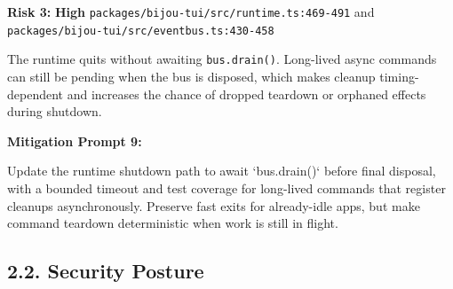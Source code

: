 \textbf{Risk 3:} \textbf{High} \textbar{} \texttt{p\allowbreak{}a\allowbreak{}c\allowbreak{}k\allowbreak{}a\allowbreak{}g\allowbreak{}e\allowbreak{}s\allowbreak{}/\allowbreak{}b\allowbreak{}i\allowbreak{}j\allowbreak{}o\allowbreak{}u\allowbreak{}-\allowbreak{}t\allowbreak{}u\allowbreak{}i\allowbreak{}/\allowbreak{}s\allowbreak{}r\allowbreak{}c\allowbreak{}/\allowbreak{}r\allowbreak{}u\allowbreak{}n\allowbreak{}t\allowbreak{}i\allowbreak{}m\allowbreak{}e\allowbreak{}.\allowbreak{}t\allowbreak{}s\allowbreak{}:\allowbreak{}4\allowbreak{}6\allowbreak{}9\allowbreak{}-\allowbreak{}4\allowbreak{}9\allowbreak{}1} and \texttt{p\allowbreak{}a\allowbreak{}c\allowbreak{}k\allowbreak{}a\allowbreak{}g\allowbreak{}e\allowbreak{}s\allowbreak{}/\allowbreak{}b\allowbreak{}i\allowbreak{}j\allowbreak{}o\allowbreak{}u\allowbreak{}-\allowbreak{}t\allowbreak{}u\allowbreak{}i\allowbreak{}/\allowbreak{}s\allowbreak{}r\allowbreak{}c\allowbreak{}/\allowbreak{}e\allowbreak{}v\allowbreak{}e\allowbreak{}n\allowbreak{}t\allowbreak{}b\allowbreak{}u\allowbreak{}s\allowbreak{}.\allowbreak{}t\allowbreak{}s\allowbreak{}:\allowbreak{}4\allowbreak{}3\allowbreak{}0\allowbreak{}-\allowbreak{}4\allowbreak{}5\allowbreak{}8}

The runtime quits without awaiting \texttt{b\allowbreak{}u\allowbreak{}s\allowbreak{}.\allowbreak{}d\allowbreak{}r\allowbreak{}a\allowbreak{}i\allowbreak{}n\allowbreak{}(\allowbreak{})}. Long-lived async commands can still be pending when the bus is disposed, which makes cleanup timing-dependent and increases the chance of dropped teardown or orphaned effects during shutdown.

\textbf{Mitigation Prompt 9:}

\begin{CodeBlock}
Update the runtime shutdown path to await `bus.drain()` before final disposal, with a bounded timeout and test coverage for long-lived commands that register cleanups asynchronously. Preserve fast exits for already-idle apps, but make command teardown deterministic when work is still in flight.
\end{CodeBlock}

\subsection{2.2. Security Posture}\label{record-418-security-posture}

